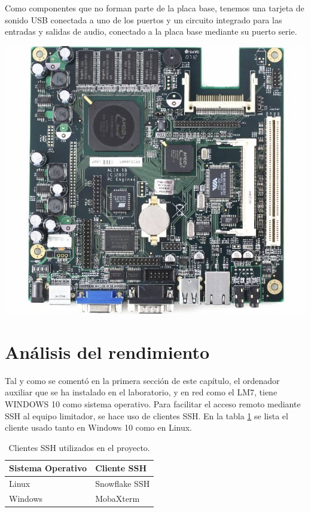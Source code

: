 Como componentes que no forman parte de la placa base, tenemos una tarjeta de sonido USB conectada a uno de los puertos y un circuito integrado para las entradas y salidas de audio, conectado a la placa base mediante su puerto serie.

\begin{center}
    \includegraphics[scale=0.5]{imagenes/alix1b.jpg}
    \label{img:alix1b}
\end{center}

\section{Análisis del rendimiento}

Tal y como se comentó en la primera sección de este capítulo, el ordenador auxiliar que se ha instalado en el laboratorio, y en red como el \gls{LM7}, tiene \gls{WINDOWS} 10 como sistema operativo. Para facilitar el acceso remoto mediante \acrshort{SSH} al equipo limitador, se hace uso de clientes \acrshort{SSH}. En la tabla \ref{tab:gestoresSSH} se lista el cliente usado tanto en Windows 10 como en Linux.

\begin{table}[h]
    \centering
    \begin{tabular}{|l|l|}
        \hline
        \rowcolor[HTML]{ECF4FF}
        Sistema Operativo & Cliente SSH   \\ \hline
        Linux             & Snowflake SSH \\ \hline
        Windows           & MobaXterm     \\ \hline
    \end{tabular}
    \caption{Clientes \acrshort{SSH} utilizados en el proyecto.}
    \label{tab:gestoresSSH}
\end{table}

